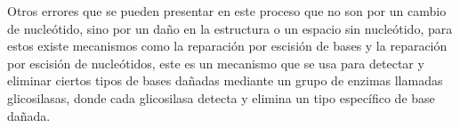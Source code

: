 \documentclass[12pt]{article}
\begin{document}
Otros errores que se pueden presentar en este proceso que no son por un cambio de nucleótido, sino por un daño en la estructura o un espacio sin nucleótido, para estos existe mecanismos como la reparación por escisión de bases y la reparación por escisión de nucleótidos, este es un mecanismo que se usa para detectar y eliminar ciertos tipos de bases dañadas mediante un grupo de enzimas llamadas glicosilasas, donde cada glicosilasa detecta y elimina un tipo específico de base dañada.\\





\nocite{*}
\end{document}
